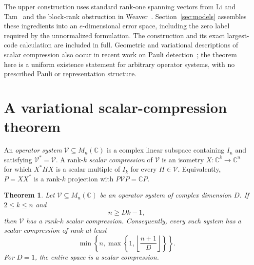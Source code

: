 \documentclass[11pt]{article}
\newcommand{\C}{\mathbb C}
\newcommand{\V}{\mathcal V}
\newtheorem{theorem}{Theorem}[section]
\theoremstyle{remark}
\numberwithin{equation}{section}
\begin{document}
The upper construction uses standard rank-one spanning vectors from
Li and Tam~\cite[Section~2.1]{LiTam} and the block-rank obstruction
in Weaver~\cite[Proposition~2.1]{Weaver}. Section~\ref{sec:models}
assembles these ingredients into an $e$-dimensional error space, including
the zero label required by the unnormalized formulation. The construction
and its exact largest-code calculation are included in full. Geometric
and variational descriptions of scalar compression also occur in recent
work on Pauli detection~\cite{Gupta,Sun}; the theorem here is a uniform
existence statement for arbitrary operator systems, with no prescribed
Pauli or representation structure.

\section{A variational scalar-compression theorem}\label{sec:variance}

An \emph{operator system} $\V\subseteq M_n(\C)$ is a complex linear
subspace containing $I_n$ and satisfying $\V^*=\V$. A rank-$k$
\emph{scalar compression} of $\V$ is an isometry
$X:\C^k\longrightarrow\C^n$ for which $X^*HX$ is a scalar multiple
of $I_k$ for every $H\in\V$. Equivalently, $P=XX^*$ is a rank-$k$
projection with $P\V P=\C P$.

\begin{theorem}\label{thm:compression}
Let $\V\subseteq M_n(\C)$ be an operator system of complex dimension
$D$. If $2\le k\le n$ and
\begin{equation}\label{eq:threshold}
 n\ge Dk-1,
\end{equation}
then $\V$ has a rank-$k$ scalar compression. Consequently, every such
system has a scalar compression of rank at least
\begin{equation}\label{eq:rank-bound}
 \min\!\left\{n,\max\!\left\{1,
 \left\lfloor\frac{n+1}{D}\right\rfloor\right\}\right\}.
\end{equation}
For $D=1$, the entire space is a scalar compression.
\end{theorem}
\end{document}
